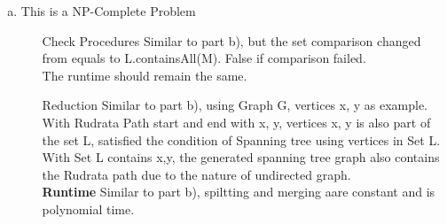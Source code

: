 \documentclass{article}
\begin{document}
\begin{enumerate}[a)]
\begin{itemize}
        \end{itemize}
    \item This is a NP-Complete Problem
        \begin{itemize}
            \item [Check Procedures] Similar to part b), but the set comparison changed from equals to L.containsAll(M). False if comparison failed.\\
            The runtime should remain the same.
            \item [Reduction] Similar to part b), using Graph G, vertices x, y as example. \\
            With Rudrata Path start and end with x, y, vertices x, y is also part of the set L, satisfied the condition of Spanning tree using vertices in Set L. \\
            With Set L contains x,y, the generated spanning tree graph also contains the Rudrata path due to the nature of undirected graph. \\
            \textbf{Runtime} Similar to part b), spiltting and merging aare constant and is polynomial time. 
        \end{itemize}
\end{enumerate}
\end{document}
